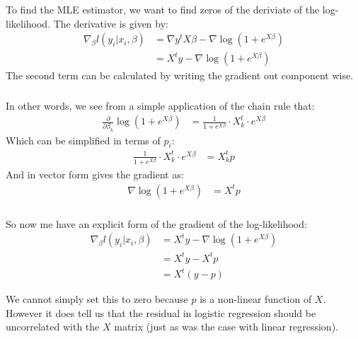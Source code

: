 \begin{frame}[fragile] \frametitle{}

To find the MLE estimator, we want to find zeros of the deriviate of
the log-likelihood. The derivative is given by:
\begin{align*}
\nabla_\beta l(y_i | x_i, \beta)
&= \nabla y^t X \beta - \nabla \log(1 + e^{X\beta}) \\
&= X^t y - \nabla \log(1 + e^{X\beta})
\end{align*}
\pause The second term can be calculated by writing the gradient out
component wise.

\end{frame}

\begin{frame}[fragile] \frametitle{}

In other words, we see from a simple application of the chain
rule that:
\begin{align*}
\frac{\partial}{\partial \beta_k} \log(1 + e^{X \beta})
&= \frac{1}{1 + e^{X \beta}} \cdot X_k^t \cdot e^{X \beta}
\end{align*}
\pause Which can be simplified in terms of $p_i$:
\begin{align*}
\frac{1}{1 + e^{X \beta}} \cdot X_k^t \cdot e^{X \beta}
&= X_k^t p
\end{align*}
\pause And in vector form gives the gradient as:
\begin{align*}
\nabla \log(1 + e^{X\beta}) &= X^t p
\end{align*}

\end{frame}

\begin{frame}[fragile] \frametitle{}

So now me have an explicit form of the gradient of the
log-likelihood:
\begin{align*}
\nabla_\beta l(y_i | x_i, \beta)
&= X^t y - \nabla \log(1 + e^{X\beta}) \\
&= X^t y - X^t p \\
&= X^t (y - p)
\end{align*}

\pause We cannot simply set this to zero because $p$ is a non-linear
function of $X$. However it does tell us that the residual in logistic
regression should be uncorrelated with the $X$ matrix (just as was
the case with linear regression).

\end{frame}

